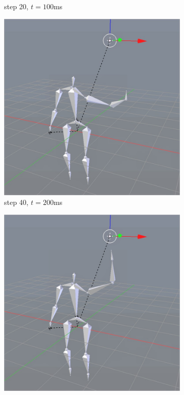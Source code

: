 \documentclass[10pt,twocolumn,letterpaper]{article}
\begin{document}
\begin{figure}[]
\begin{subfigure}{0.2\textwidth}
        \caption{step 20, $t=100$ms}
    \end{subfigure}\begin{subfigure}{0.2\textwidth}
        \centering
        \includegraphics[width=.9\linewidth]{raise-circ-2.jpg}
        \caption{step 40, $t=200$ms}
    \end{subfigure}\begin{subfigure}{0.2\textwidth}
        \centering
        \includegraphics[width=.9\linewidth]{raise-circ-3.jpg}

\end{subfigure}
\end{figure}
\end{document}
